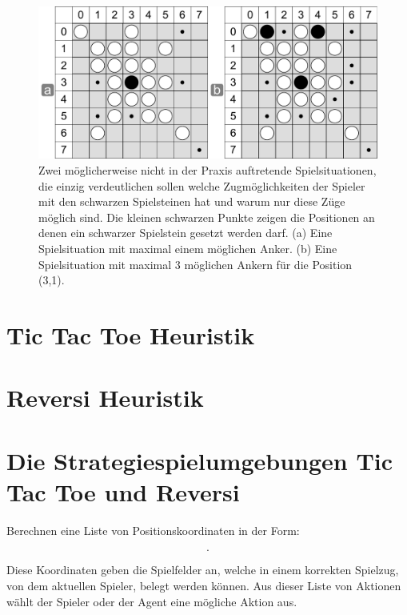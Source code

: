 \begin{figure}[!htbp]
  \centering
  \includegraphics[scale=0.5]{inhalt/abbildungen/zuege_schwarz_reversi.pdf}
  \caption{Zwei möglicherweise nicht in der Praxis auftretende Spielsituationen, die einzig verdeutlichen sollen welche Zugmöglichkeiten der Spieler mit den schwarzen Spielsteinen hat und warum nur diese Züge möglich sind. Die kleinen schwarzen Punkte zeigen die Positionen an denen ein schwarzer Spielstein gesetzt werden darf. (a) Eine Spielsituation mit maximal einem möglichen Anker. (b) Eine Spielsituation mit maximal 3 möglichen Ankern für die Position (3,1).}
  \label{fig:zuege_schwarz_reversi}
\end{figure}


\section{Tic Tac Toe Heuristik}

\section{Reversi Heuristik}

\section{Die Strategiespielumgebungen Tic Tac Toe und Reversi}

Berechnen eine Liste von Positionskoordinaten in der Form: 

\begin{equation*}
[Tupel(X_a Koordinate, Y_b Koordinate), ...].
\end{equation*}

Diese Koordinaten geben die Spielfelder an, welche in einem korrekten Spielzug, von dem aktuellen Spieler, belegt werden können. Aus dieser Liste von Aktionen wählt der Spieler oder der Agent eine mögliche Aktion aus.\\

